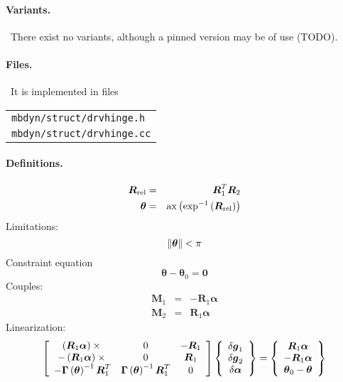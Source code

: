 \documentclass[10pt,dvips,fleqn]{report}
\newcommand{\T}[1]{\boldsymbol{#1}}
\begin{document}
\paragraph{Variants.} \
There exist no variants, although a pinned version may be of use (TODO).

\paragraph{Files.} \
It is implemented in files

\begin{tabular}{l}
\texttt{mbdyn/struct/drvhinge.h} \\
\texttt{mbdyn/struct/drvhinge.cc}
\end{tabular}

\paragraph{Definitions.}
\begin{eqnarray*}
	\T{R}_{\text{rel}} & = & \T{R}_1^T \T{R}_2 \\
	\T{\theta} & = & \llk{ax}\plbr{\llk{exp}^{-1}\plbr{\T{R}_{\text{rel}}}}
\end{eqnarray*}
Limitations:
\begin{equation}
	\nrbr{\T{\theta}} < \pi
\end{equation}
Constraint equation 
\begin{equation}
	\T{\theta} - \T{\theta}_0 = \T{0}
\end{equation}
Couples:
\begin{eqnarray*}
	\T{M}_1 & = & -\T{R}_1 \T{\alpha} \\
	\T{M}_2 & = & \T{R}_1 \T{\alpha}
\end{eqnarray*}
Linearization:
\begin{equation}
	\sqbr{\matr{ccc}{
		\plbr{\T{R}_1 \T{\alpha}}\times{} & 0 & -\T{R}_1 \\
		-\plbr{\T{R}_1 \T{\alpha}}\times{} & 0 & \T{R}_1 \\
		-\T{\Gamma}\plbr{\T{\theta}}^{-1} \T{R}_1^T &
			\T{\Gamma}\plbr{\T{\theta}}^{-1} \T{R}_1^T & 0
	}}\cubr{\cvvect{
		\delta\T{g}_1 \\
		\delta\T{g}_2 \\
		\delta\T{\alpha} \\
	}} = \cubr{\cvvect{
		\T{R}_1 \T{\alpha} \\
		-\T{R}_1 \T{\alpha} \\
		\T{\theta}_0 - \T{\theta}
	}}
\end{equation}
\end{document}
